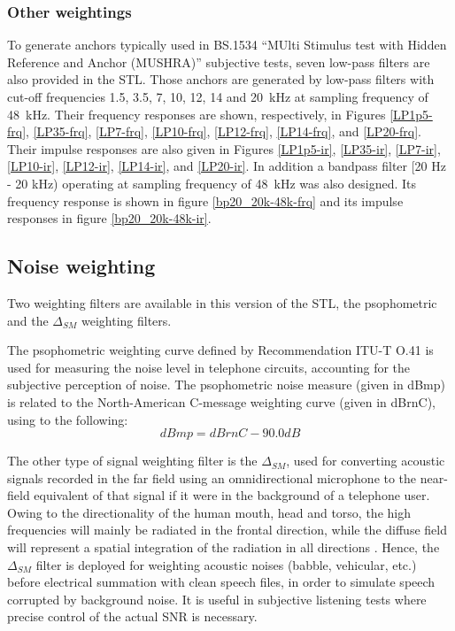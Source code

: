 \subsubsection{Other weightings}
To generate anchors typically used in BS.1534 \cite{BS.1534} ``MUlti
Stimulus test with Hidden Reference and Anchor (MUSHRA)'' subjective
tests, seven low-pass filters are also provided in the STL. Those
anchors are generated by low-pass filters with cut-off frequencies
1.5, 3.5, 7, 10, 12, 14 and 20~kHz at sampling frequency of
48~kHz. Their frequency responses are shown, respectively, in Figures
\ref{LP1p5-frq}, \ref{LP35-frq}, \ref{LP7-frq}, \ref{LP10-frq},
\ref{LP12-frq}, \ref{LP14-frq}, and \ref{LP20-frq}. Their impulse
responses are also given in Figures \ref{LP1p5-ir}, \ref{LP35-ir},
\ref{LP7-ir}, \ref{LP10-ir}, \ref{LP12-ir}, \ref{LP14-ir}, and
\ref{LP20-ir}. In addition a bandpass filter [20 Hz - 20 kHz)
  operating at sampling frequency of 48~kHz was also designed. Its
  frequency response is shown in figure \ref{bp20_20k-48k-frq} and its
  impulse responses in figure \ref{bp20_20k-48k-ir}.

\subsection{Noise weighting}

Two weighting filters are available in this version of the STL,
the psophometric and the $\Delta_{SM}$ weighting filters.

The psophometric weighting curve defined by Recommendation ITU-T O.41
is used for measuring the noise level in telephone circuits,
accounting for the subjective perception of noise. The psophometric
noise measure (given in dBmp) is related to the North-American
C-message weighting curve (given in dBrnC), using to the
following:
\[
    dBmp = dBrnC - 90.0 dB
\]

The other type of signal weighting filter is the $\Delta_{SM}$, used
for converting acoustic signals recorded in the far field using an
omnidirectional microphone to the near-field equivalent of that signal
if it were in the background of a telephone user. Owing to the
directionality of the human mouth, head and torso, the high
frequencies will mainly be radiated in the frontal direction, while
the diffuse field will represent a spatial integration of the
radiation in all directions \cite{LTASS}. Hence, the $\Delta_{SM}$
filter is deployed for weighting acoustic noises (babble, vehicular,
etc.) before electrical summation with clean speech files, in order to
simulate speech corrupted by background noise. It is useful in
subjective listening tests where precise control of the actual SNR is
necessary.

